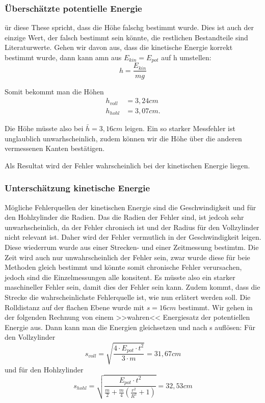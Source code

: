 \subsubsection*{Überschätzte potentielle Energie}
ür diese These spricht, dass die Höhe falschg bestimmt wurde. Dies ist auch der einzige Wert, der falsch bestimmt sein könnte, die restlichen Bestandteile sind Literaturwerte. Gehen wir davon aus, dass die kinetische Energie korrekt bestimmt wurde, dann kann amn aus $E_{kin} = E_{pot}$ auf h umstellen:
\begin{equation}
    h = \frac{E_{kin}}{mg}
\end{equation}

Somit bekommt man die Höhen
\begin{align}
h_{voll} &= 3,24 cm \\
h_{hohl} &= 3,07 cm.
\end{align}

Die Höhe müsste also bei $\bar h = 3,16 cm$ leigen. Ein so starker Messfehler ist unglaublich unwarhscheinlich, zudem können wir die Höhe über die anderen vermessenen Kanten bestätigen.

Als Resultat wird der Fehler wahrscheinlich bei der kinetischen Energie liegen.

\subsubsection*{Unterschätzung kinetische Energie}
Mögliche Fehlerquellen der kinetischen Energie sind die Geschwindigkeit und für den Hohlzylinder die Radien. Das die Radien der Fehler sind, ist jedcoh sehr unwarhscheinlich, da der Fehler chronisch ist und der Radius für den Vollzylinder nicht relevant ist. Daher wird der Fehler vermutlich in der Geschwindigkeit leigen. 
Diese wiederrum wurde aus einer Strecken- und einer Zeitmessung bestimtm. Die Zeit wird auch nur unwahrscheinlich der Fehler sein, zwar wurde diese für beie Methoden gleich bestimmt und könnte somit chronische Fehler verursachen, jedoch sind die Einzelmessungen alle konsitent. Es müsste also ein starker maschineller Fehler sein, damit dies der Fehler sein kann. Zudem kommt, dass die Strecke die wahrscheinlichste Fehlerquelle ist, wie nun erlätert werden soll.
Die Rolldistanz auf der flachen Ebene wurde mit $s = 16cm$ bestimmt.  Wir gehen in der folgenden Rechnung von einem >>wahren<< Energiesatz der potentiellen Energie aus. Dann kann man die Energien gleichsetzen und nach s auflösen:
Für den Vollzylinder
\begin{equation}
    s_{voll} = \sqrt{\frac{4 \cdot E_{pot} \cdot t^2}{3 \cdot m}} = 31,67 cm
\end{equation}
und für den Hohlzylinder
\begin{equation}
    s_{hohl} = \sqrt{\frac{E_{pot} \cdot t^2}{\frac{m}{2}+\frac{m}{4}(\frac{r^2}{R^2}+1)}} = 32,53 cm
\end{equation}

